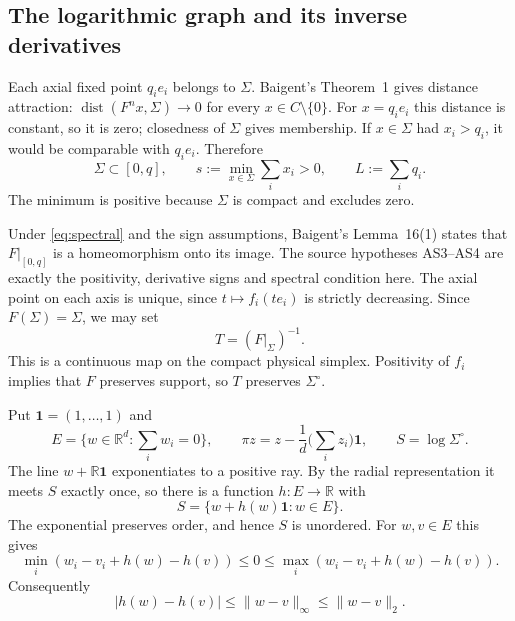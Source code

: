 \documentclass[11pt]{article}
\newcommand{\one}{\mathbf 1}
\begin{document}
\subsection{The logarithmic graph and its inverse derivatives}

Each axial fixed point $q_i e_i$ belongs to $\Sigma$. Baigent's
Theorem~1 \cite{Baigent} gives distance attraction:
$\operatorname{dist}(F^n x,\Sigma)\to0$ for every $x\in C\setminus\{0\}$.
For $x=q_i e_i$ this distance is constant, so it is zero; closedness of
$\Sigma$ gives membership. If $x\in\Sigma$ had $x_i>q_i$, it would be
comparable with $q_i e_i$. Therefore
\begin{equation}\label{eq:mass}
 \Sigma\subset[0,q],\qquad
 s:=\min_{x\in\Sigma}\sum_i x_i>0,\qquad L:=\sum_i q_i.
\end{equation}
The minimum is positive because $\Sigma$ is compact and excludes zero.

Under \eqref{eq:spectral} and the sign assumptions, Baigent's
Lemma~16(1) \cite{Baigent} states that $F|_{[0,q]}$ is a homeomorphism
onto its image. The source hypotheses AS3--AS4 are exactly the positivity,
derivative signs and spectral condition here. The axial point on each axis
is unique, since $t\mapsto f_i(t e_i)$ is strictly decreasing.
Since $F(\Sigma)=\Sigma$, we may set
\[
 T=(F|_\Sigma)^{-1}.
\]
This is a continuous map on the compact physical simplex. Positivity of
$f_i$ implies that $F$ preserves support, so $T$ preserves $\Sigma^\circ$.

Put $\one=(1,\ldots,1)$ and
\[
 E=\{w\in\mathbb R^d:\textstyle\sum_i w_i=0\},\qquad
 \pi z=z-\frac1d\Big(\sum_i z_i\Big)\one,
 \qquad S=\log\Sigma^\circ.
\]
The line $w+\mathbb R\one$ exponentiates to a positive ray. By the radial
representation it meets $S$ exactly once, so there is a function $h:E\to
\mathbb R$ with
\begin{equation}\label{eq:graph}
 S=\{w+h(w)\one:w\in E\}.
\end{equation}
The exponential preserves order, and hence $S$ is unordered. For $w,v\in E$
this gives
\[
 \min_i(w_i-v_i+h(w)-h(v))\leq0\leq
 \max_i(w_i-v_i+h(w)-h(v)).
\]
Consequently
\begin{equation}\label{eq:lipschitz}
 |h(w)-h(v)|\leq\|w-v\|_\infty\leq\|w-v\|_2.
\end{equation}
\end{document}
